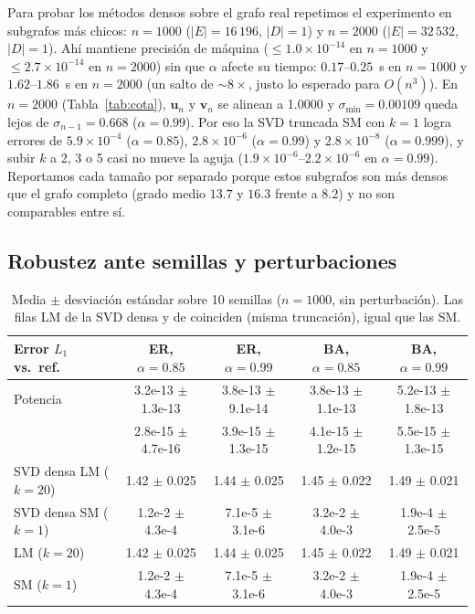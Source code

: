 \documentclass[11pt,a4paper]{article}
\newcommand{\code}[1]{\texttt{\detokenize{#1}}}
\begin{document}
Para probar los m\'etodos densos sobre el grafo real repetimos el experimento en subgrafos m\'as chicos: $n=1000$ ($|E|=16\,196$, $|D|=1$) y $n=2000$ ($|E|=32\,532$, $|D|=1$). Ah\'i \code{pinv} mantiene precisi\'on de m\'aquina ($\le 1.0\times10^{-14}$ en $n=1000$ y $\le 2.7\times10^{-14}$ en $n=2000$) sin que $\alpha$ afecte su tiempo: $0.17$--$0.25$~s en $n=1000$ y $1.62$--$1.86$~s en $n=2000$ (un salto de $\sim 8\times$, justo lo esperado para $O(n^3)$). En $n=2000$ (Tabla~\ref{tab:cota}), $\mathbf u_n$ y $\mathbf v_n$ se alinean a 1.0000 y $\sigma_{\min}=0.00109$ queda lejos de $\sigma_{n-1}=0.668$ ($\alpha=0.99$). Por eso la SVD truncada SM con $k=1$ logra errores de $5.9\times10^{-4}$ ($\alpha=0.85$), $2.8\times10^{-6}$ ($\alpha=0.99$) y $2.8\times10^{-8}$ ($\alpha=0.999$), y subir $k$ a 2, 3 o 5 casi no mueve la aguja ($1.9\times10^{-6}$--$2.2\times10^{-6}$ en $\alpha=0.99$). Reportamos cada tama\~no por separado porque estos subgrafos son m\'as densos que el grafo completo (grado medio $13.7$ y $16.3$ frente a $8.2$) y no son comparables entre s\'i.

\subsection{Robustez ante semillas y perturbaciones}
\begin{table}[!htbp]
\centering\scriptsize\setlength{\tabcolsep}{3.5pt}
\begin{tabular}{@{}lcccc@{}}
\toprule
Error $L_1$ vs.\ ref. & ER, $\alpha=0.85$ & ER, $\alpha=0.99$ & BA, $\alpha=0.85$ & BA, $\alpha=0.99$\\
\midrule
Potencia        & 3.2e-13 $\pm$ 1.3e-13 & 3.8e-13 $\pm$ 9.1e-14 & 3.8e-13 $\pm$ 1.1e-13 & 5.2e-13 $\pm$ 1.8e-13\\
\code{pinv}     & 2.8e-15 $\pm$ 4.7e-16 & 3.9e-15 $\pm$ 1.3e-15 & 4.1e-15 $\pm$ 1.2e-15 & 5.5e-15 $\pm$ 1.3e-15\\
SVD densa LM ($k=20$)  & 1.42 $\pm$ 0.025 & 1.44 $\pm$ 0.025 & 1.45 $\pm$ 0.022 & 1.49 $\pm$ 0.021\\
SVD densa SM ($k=1$)   & 1.2e-2 $\pm$ 4.3e-4 & 7.1e-5 $\pm$ 3.1e-6 & 3.2e-2 $\pm$ 4.0e-3 & 1.9e-4 $\pm$ 2.5e-5\\
\code{svds} LM ($k=20$)& 1.42 $\pm$ 0.025 & 1.44 $\pm$ 0.025 & 1.45 $\pm$ 0.022 & 1.49 $\pm$ 0.021\\
\code{svds} SM ($k=1$) & 1.2e-2 $\pm$ 4.3e-4 & 7.1e-5 $\pm$ 3.1e-6 & 3.2e-2 $\pm$ 4.0e-3 & 1.9e-4 $\pm$ 2.5e-5\\
\bottomrule
\end{tabular}
\caption{Media $\pm$ desviaci\'on est\'andar sobre 10 semillas ($n=1000$, sin perturbaci\'on). Las filas LM de la SVD densa y de \code{svds} coinciden (misma truncaci\'on), igual que las SM.}
\label{tab:g-l1}
\end{table}
\end{document}
